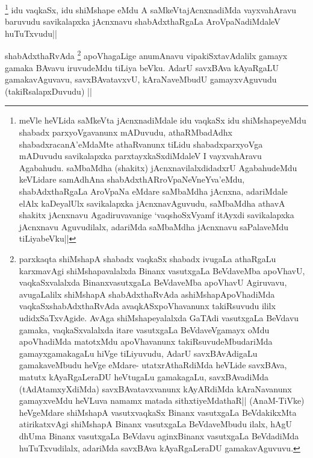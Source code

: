 \begin{artha}
\footnote[2]{meVle heVLida saMkeVta jAcnxnadiMdale idu vaqkaSx idu shiMshapeyeMdu shabadx parxyoVgavanunx mADuvudu, athaRMbadAdhx shabadxracanA'eMdaMte athaRvanunx tiLidu shabadxparxyoVga mADuvudu savikalapxka parxtayxkaSxdiMdaleV I vayxvahAravu Agabahudu. saMbaMdha (shakitx) jAcnxnavilalxdidadxrU AgabahudeMdu keVLidare samAdhAna shabAdxthARroVpaNeVneYva'eMdu, shabAdxthaRgaLa AroVpaNa eMdare saMbaMdha jAcnxna, adariMdale elAlx kaDeyalUlx savikalapxka jAcnxnavAguvudu, saMbaMdha athavA shakitx jAcnxnavu Agadiruvavanige `vaqshoSxV\s yamf itAyxdi savikalapxka jAcnxnavu Aguvudilalx, adariMda saMbaMdha jAcnxnavu saPalaveMdu tiLiyabeVku||}
idu vaqkaSx, idu shiMshape eMdu A saMkeVtajAcnxnadiMda vayxvahAravu baruvudu savikalapxka jAcnxnavu shabAdxthaRgaLa AroVpaNadiMdaleV huTuTxvudu||
\end{artha}

\begin{artha}
shabAdxthaRvAda \footnote[3]{parxkaqta shiMshapA shabadx vaqkaSx shabadx ivugaLa athaRgaLu karxmavAgi shiMshapavalalxda Binanx vasutxgaLa BeVdaveMba apoVhavU, vaqkaSxvalalxda BinanxvasutxgaLa BeVdaveMba apoVhavU Agiruvavu, avugaLalilx shiMshapA shabAdxthaRvAda ashiMshapApoVhadiMda vaqkaSxshabAdxthaRvAda avaqkASxpoVhavanunx takiRsuvudu ililx udidxSaTxvAgide. AvAga shiMshapeyalalxda GaTAdi vasutxgaLa BeVdavu gamaka, vaqkaSxvalalxda itare vasutxgaLa BeVdaveVgamayx oMdu apoVhadiMda matotxMdu apoVhavanunx takiRsuvudeMbudariMda gamayxgamakagaLu hiVge tiLiyuvudu, AdarU savxBAvAdigaLu gamakaveMbudu heVge eMdare- utatxrAthaRdiMda heVLide savxBAva, matutx kAyaRgaLeraDU heVtugaLu gamakagaLu, savxBAvadiMda (tAdAtamxyXdiMda) savxBAvatavxvanunx kAyARdiMda kAraNavanunx gamayxveMdu heVLuva namamx matada sithxtiyeMdathaR|| (AnaM-TiVke) heVgeMdare shiMshapA vasutxvaqkaSx Binanx vasutxgaLa BeVdakikxMta atirikatxvAgi shiMshapA Binanx vasutxgaLa BeVdaveMbudu ilalx, hAgU dhUma Binanx vasutxgaLa BeVdavu aginxBinanx vasutxgaLa BeVdadiMda huTuTxvudilalx, adariMda savxBAva kAyaRgaLeraDU gamakavAguvuvu.} apoVhagaLige anumAnavu vipakiSxtavAdalilx gamayx gamaka BAvavu iruvudeMdu tiLiya beVku. AdarU savxBAva kAyaRgaLU gamakavAguvavu, savxBAvatavxvU, kAraNaveMbudU gamayxvAguvudu (takiRsalapxDuvudu) || 
\end{artha}

